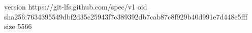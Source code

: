 version https://git-lfs.github.com/spec/v1
oid sha256:7634395549dbf2d35c25943f7c389392db7cab87c8f929b40d991e7d448e5fff
size 5566
